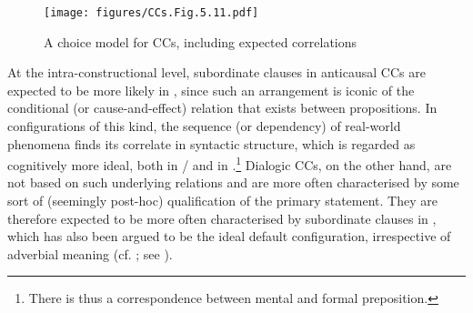 \begin{figure}
\texttt{[image: figures/CCs.Fig.5.11.pdf]}
\caption{\label{bkm:Ref35882786}\label{fig:5.11}A choice model for CCs, including expected correlations}
 \end{figure}

At the intra-constructional level, subordinate clauses in anticausal CCs are expected to be more likely in , since such an arrangement is iconic of the conditional (or cause-and-effect) relation that exists between propositions. In configurations of this kind, the sequence (or dependency) of real-world phenomena finds its correlate in syntactic structure, which is regarded as cognitively more ideal, both in / and in .\footnote{There is thus a correspondence between mental  and formal preposition.} Dialogic CCs, on the other hand, are not based on such underlying relations and are more often characterised by some sort of (seemingly post-hoc) qualification of the primary statement. They are therefore expected to be more often characterised by subordinate clauses in , which has also been argued to be the ideal default configuration, irrespective of adverbial meaning (cf. \citealt{Diessel2005}; see ).

